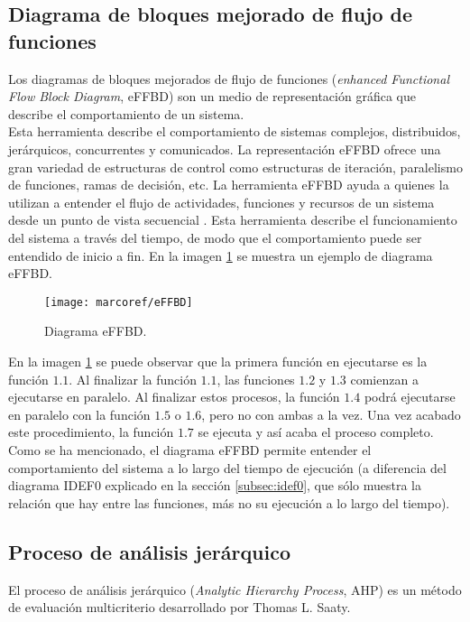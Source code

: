 		\subsection{Diagrama de bloques mejorado de flujo de funciones} \label{subsec:effbd}
Los diagramas de bloques mejorados de flujo de funciones (\textit{enhanced Functional Flow Block Diagram}, eFFBD) son un medio de representaci\'on gr\'afica que describe el comportamiento de un sistema.\\

\noindent Esta herramienta describe el comportamiento de sistemas complejos, distribuidos, jer\'arquicos, concurrentes y comunicados. La representaci\'on eFFBD ofrece una gran variedad de estructuras de control como estructuras de iteraci\'on, paralelismo de funciones, ramas de decisi\'on, etc. La herramienta eFFBD ayuda a quienes la utilizan a entender el flujo de actividades, funciones y recursos de un sistema desde un punto de vista secuencial \cite{NASA_handbook}. Esta herramienta describe el funcionamiento del sistema a trav\'es del tiempo, de modo que el comportamiento puede ser entendido de inicio a fin. En la imagen \ref{img:diagramaeFFBD} se muestra un ejemplo de diagrama eFFBD.

\begin{figure}[H]
	\centering
		\texttt{[image: marcoref/eFFBD]}
	\caption{Diagrama eFFBD.}
	\label{img:diagramaeFFBD}
\end{figure}

En la imagen \ref{img:diagramaeFFBD} se puede observar que la primera funci\'on en ejecutarse es la funci\'on $1.1$. Al finalizar la funci\'on $1.1$, las funciones $1.2$ y $1.3$ comienzan a ejecutarse en paralelo. Al finalizar estos procesos, la funci\'on $1.4$ podr\'a ejecutarse en paralelo con la funci\'on $1.5$ o $1.6$, pero no con ambas a la vez. Una vez acabado este procedimiento, la funci\'on $1.7$ se ejecuta y as\'i acaba el proceso completo.\\

\noindent Como se ha mencionado, el diagrama eFFBD permite entender el comportamiento del sistema a lo largo del tiempo de ejecuci\'on (a diferencia del diagrama IDEF0 explicado en la secci\'on \ref{subsec:idef0}, que s\'olo muestra la relaci\'on que hay entre las funciones, m\'as no su ejecuci\'on a lo largo del tiempo).

		\subsection{Proceso de an\'alisis jer\'arquico} \label{subsec:ahp}
El proceso de an\'alisis jer\'arquico (\textit{Analytic Hierarchy Process}, AHP) es un m\'etodo de evaluaci\'on multicriterio desarrollado por Thomas L. Saaty.\\

